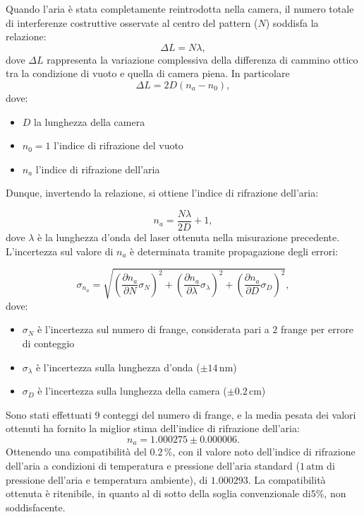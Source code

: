 \documentclass[a4paper,12pt]{article}
\begin{document}
Quando l’aria è stata completamente reintrodotta nella camera, il numero totale di interferenze costruttive osservate al centro del pattern (\(N\)) soddisfa la relazione:
\begin{equation}
\Delta L = N\lambda,
\label{eq:delta_cammino_ottico}
\end{equation}
dove \( \Delta L \) rappresenta la variazione complessiva della differenza di cammino ottico tra la condizione di vuoto e quella di camera piena. In particolare
\[
\Delta L = 2D (n_a - n_0),
\]
dove:
\begin{itemize}
    \item \( D \) la lunghezza della camera
    \item \( n_0 = 1 \) l'indice di rifrazione del vuoto
    \item \( n_a \) l'indice di rifrazione dell’aria
\end{itemize}
Dunque, invertendo la relazione, si ottiene l’indice di rifrazione dell’aria:

\begin{equation}
n_a = \frac{N\lambda}{2D} + 1,
\label{eq:indice_rifrazione}
\end{equation}
dove \( \lambda \) è la lunghezza d’onda del laser ottenuta nella misurazione precedente.
L’incertezza sul valore di \( n_a \) è determinata tramite propagazione degli errori:

\begin{equation}
\sigma_{n_a} = \sqrt{\left(\frac{\partial n_a}{\partial N} \sigma_N\right)^2 + \left(\frac{\partial n_a}{\partial \lambda} \sigma_\lambda\right)^2 + \left(\frac{\partial n_a}{\partial D} \sigma_D\right)^2},
\label{eq:incertezza_indice}
\end{equation}
dove:
\begin{itemize}
    \item \( \sigma_N \) è l’incertezza sul numero di frange, considerata pari a 2 frange per errore di conteggio
    \item \( \sigma_\lambda \) è l’incertezza sulla lunghezza d’onda (\( \pm 14 \, \text{nm} \))
    \item \( \sigma_D \) è l’incertezza sulla lunghezza della camera (\( \pm 0.2 \, \text{cm} \))
\end{itemize}
Sono stati effettuati 9 conteggi del numero di frange, e la media pesata dei valori ottenuti ha fornito la miglior stima dell’indice di rifrazione dell’aria:
\begin{equation}
n_a = 1.000275 \pm 0.000006.
\label{eq:valore_na}
\end{equation}
Ottenendo una compatibilità del \( 0.2 \, \% \), con il valore noto dell’indice di rifrazione dell’aria a condizioni di temperatura e pressione dell’aria standard (\( 1 \, \text{atm} \) di pressione dell’aria e temperatura ambiente), di \( 1.000293 \). La compatibilità ottenuta è ritenibile, in quanto al di sotto della soglia convenzionale di\(5\%\), non soddisfacente. 
\end{document}
